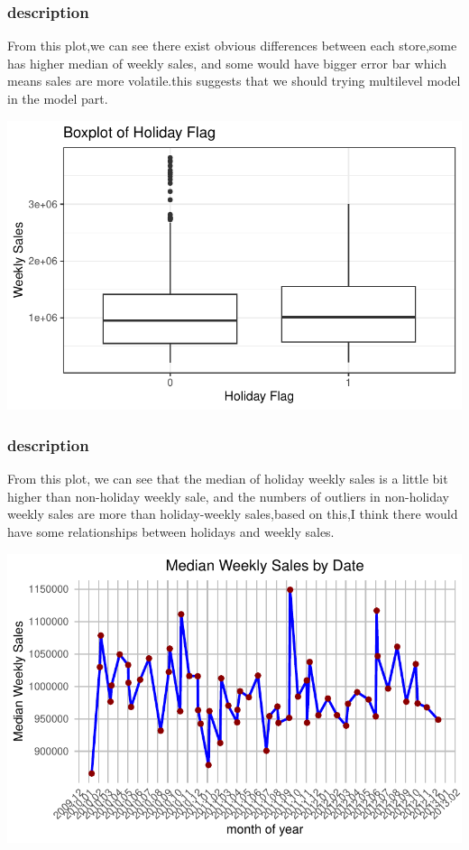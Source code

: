 \documentclass[
  letterpaper,
  DIV=11,
  numbers=noendperiod]{scrartcl}
\begin{document}
\hypertarget{description-1}{%
\subsubsection{description}\label{description-1}}

From this plot,we can see there exist obvious differences between each
store,some has higher median of weekly sales, and some would have bigger
error bar which means sales are more volatile.this suggests that we
should trying multilevel model in the model part.

\includegraphics{678final_files/figure-pdf/box-plot-1.pdf}

\hypertarget{description-2}{%
\subsubsection{description}\label{description-2}}

From this plot, we can see that the median of holiday weekly sales is a
little bit higher than non-holiday weekly sale, and the numbers of
outliers in non-holiday weekly sales are more than holiday-weekly
sales,based on this,I think there would have some relationships between
holidays and weekly sales.

\includegraphics{678final_files/figure-pdf/line-plot-1.pdf}
\end{document}
